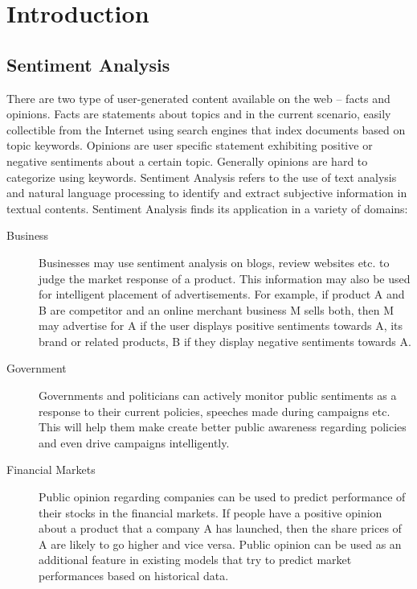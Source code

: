 \section{Introduction}

\subsection{Sentiment Analysis}
There are two type of user-generated content available on the web – facts and opinions.
Facts are statements about topics and in the current scenario, easily collectible from the Internet
	using search engines that index documents based on topic keywords.
Opinions are user specific statement exhibiting positive or negative sentiments about a certain topic.
Generally opinions are hard to categorize using keywords. %
Sentiment Analysis refers to the use of text analysis and natural language processing
	to identify and extract subjective information in textual contents. %
Sentiment Analysis finds its application in a variety of domains:

\begin{description}
\item[Business]{
Businesses may use sentiment analysis on blogs, review websites etc. to judge the market response of a product. This information may also be used for intelligent placement of advertisements. For example, if product A and B are competitor and an online merchant business M sells both, then M may advertise for A if the user displays positive sentiments towards A, its brand or related products, B if they display negative sentiments towards A.
}
\item[Government]{
Governments and politicians can actively monitor public sentiments as a response to their current policies, speeches made during campaigns etc. This will help them make create better public awareness regarding policies and even drive campaigns intelligently.
}
\item[Financial Markets]{
Public opinion regarding companies can be used to predict performance of their stocks in the financial markets. If people have a positive opinion about a product that a company A has launched, then the share prices of A are likely to go higher and vice versa. Public opinion can be used as an additional feature in existing models that try to predict market performances based on historical data.
}
\end{description}

